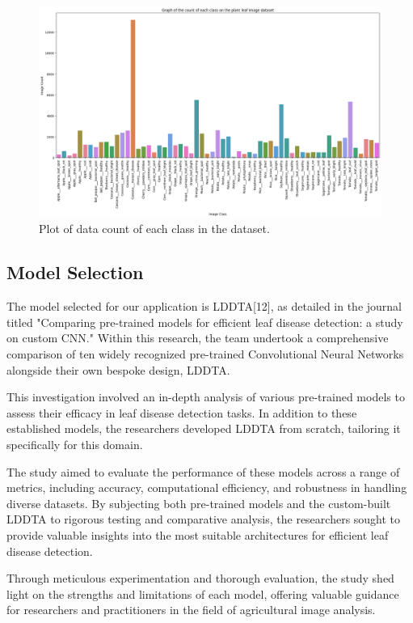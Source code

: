 \documentclass{article}
\begin{document}
\begin{figure}[h]
  \centering
  \includegraphics[width=1.0\textwidth]{image_amount}
  \caption{Plot of data count of each class in the dataset.}
  \label{fig:image_amount}
\end{figure}

\subsection{Model Selection}
The model selected for our application is LDDTA[12], as detailed in the journal titled "Comparing pre-trained models for efficient leaf disease detection: a study on custom CNN." Within this research, the team undertook a comprehensive comparison of ten widely recognized pre-trained Convolutional Neural Networks alongside their own bespoke design, LDDTA.

This investigation involved an in-depth analysis of various pre-trained models to assess their efficacy in leaf disease detection tasks. In addition to these established models, the researchers developed LDDTA from scratch, tailoring it specifically for this domain.

The study aimed to evaluate the performance of these models across a range of metrics, including accuracy, computational efficiency, and robustness in handling diverse datasets. By subjecting both pre-trained models and the custom-built LDDTA to rigorous testing and comparative analysis, the researchers sought to provide valuable insights into the most suitable architectures for efficient leaf disease detection.

Through meticulous experimentation and thorough evaluation, the study shed light on the strengths and limitations of each model, offering valuable guidance for researchers and practitioners in the field of agricultural image analysis.
\end{document}
